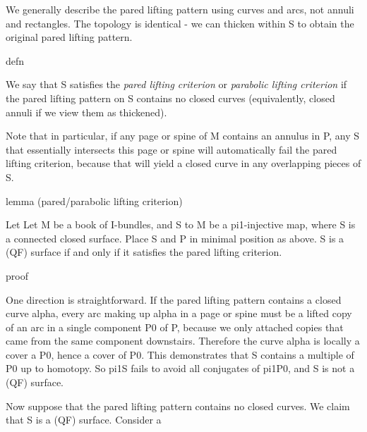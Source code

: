 We generally describe the pared lifting pattern using curves and arcs, not
annuli and rectangles. The topology is identical - we can thicken within S to
obtain the original pared lifting pattern.

defn

We say that S satisfies the \emph{pared lifting criterion} or \emph{parabolic
lifting criterion} if the pared lifting pattern on S contains no closed curves
(equivalently, closed annuli if we view them as thickened).

Note that in particular, if any page or spine of M contains an annulus in P,
any S that essentially intersects this page or spine will automatically fail
the pared lifting criterion, because that will yield a closed curve in any
overlapping pieces of S.

lemma (pared/parabolic lifting criterion)

Let Let M be a book of I-bundles, and S to M be a pi1-injective map, where S is
a connected closed surface.  Place S and P in minimal position as above. S is
a (QF) surface if and only if it satisfies the pared lifting criterion.

proof

One direction is straightforward. If the pared lifting pattern contains
a closed curve alpha, every arc making up alpha in a page or spine must be
a lifted copy of an arc in a single component P0 of P, because we only attached
copies that came from the same component downstairs. Therefore the curve alpha
is locally a cover a P0, hence a cover of P0. This demonstrates that S contains
a multiple of P0 up to homotopy. So pi1S fails to avoid all conjugates of
pi1P0, and S is not a (QF) surface.

Now suppose that the pared lifting pattern contains no closed curves. We claim
that S is a (QF) surface. Consider a


